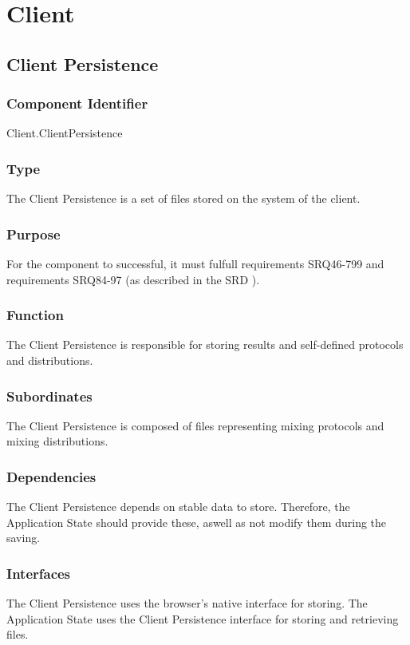 \section{Client}

\subsection{Client Persistence}

\subsubsection*{Component Identifier}
Client.ClientPersistence

\subsubsection*{Type}
The Client Persistence is a set of files stored on the system of the client.

\subsubsection*{Purpose}
For the component to successful, it must fulfull requirements SRQ46-799 and requirements SRQ84-97 (as described in the SRD \cite{srd}).

\subsubsection*{Function}
The Client Persistence is responsible for storing results and self-defined protocols and distributions.

\subsubsection*{Subordinates}
The Client Persistence is composed of files representing mixing protocols and mixing distributions.

\subsubsection*{Dependencies}
The Client Persistence depends on stable data to store. Therefore, the Application State should provide these, aswell as not modify them during the saving.

\subsubsection*{Interfaces}
The Client Persistence uses the browser's native interface for storing. The Application State uses the Client Persistence interface for storing and retrieving files.

